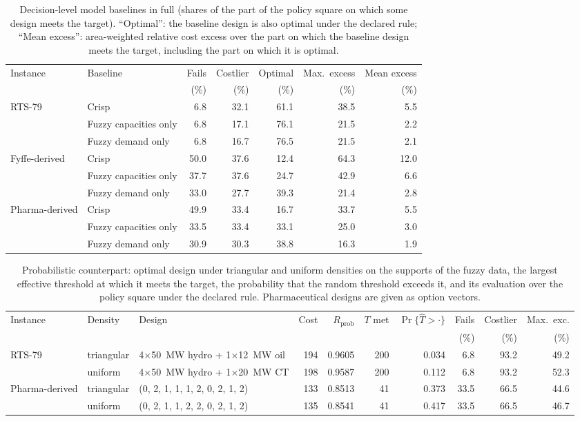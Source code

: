 \begin{table}[!htbp]
\centering
\caption{Decision-level model baselines in full (shares of the part of the policy square on which some design meets the target). ``Optimal'': the baseline design is also optimal under the declared rule; ``Mean excess'': area-weighted relative cost excess over the part on which the baseline design meets the target, including the part on which it is optimal.}
\label{tab:supp_baselines}
\footnotesize
\setlength{\tabcolsep}{4pt}
\begin{tabular}{llrrrrr}
\hline
Instance & Baseline & Fails & Costlier & Optimal & Max.\ excess & Mean excess\\
 & & (\%) & (\%) & (\%) & (\%) & (\%)\\
\hline
RTS-79 & Crisp & 6.8 & 32.1 & 61.1 & 38.5 & 5.5\\
 & Fuzzy capacities only & 6.8 & 17.1 & 76.1 & 21.5 & 2.2\\
 & Fuzzy demand only & 6.8 & 16.7 & 76.5 & 21.5 & 2.1\\
\hline
Fyffe-derived & Crisp & 50.0 & 37.6 & 12.4 & 64.3 & 12.0\\
 & Fuzzy capacities only & 37.7 & 37.6 & 24.7 & 42.9 & 6.6\\
 & Fuzzy demand only & 33.0 & 27.7 & 39.3 & 21.4 & 2.8\\
\hline
Pharma-derived & Crisp & 49.9 & 33.4 & 16.7 & 33.7 & 5.5\\
 & Fuzzy capacities only & 33.5 & 33.4 & 33.1 & 25.0 & 3.0\\
 & Fuzzy demand only & 30.9 & 30.3 & 38.8 & 16.3 & 1.9\\
\hline
\end{tabular}
\end{table}

\begin{table}[!htbp]
\centering
\caption{Probabilistic counterpart: optimal design under triangular and uniform densities on the supports of the fuzzy data, the largest effective threshold at which it meets the target, the probability that the random threshold exceeds it, and its evaluation over the policy square under the declared rule. Pharmaceutical designs are given as option vectors.}
\label{tab:supp_probabilistic}
\footnotesize
\setlength{\tabcolsep}{2.5pt}
\begin{tabular}{llp{3.3cm}rrrrrrr}
\hline
Instance & Density & Design & Cost & $R_{\mathrm{prob}}$ & $T$ met & $\Pr\{\hat{T}>\cdot\}$ & Fails & Costlier & Max.\ exc.\\
 & & & & & & & (\%) & (\%) & (\%)\\
\hline
RTS-79 & triangular & 4$\times$50~MW hydro + 1$\times$12~MW oil & 194 & 0.9605 & 200 & 0.034 & 6.8 & 93.2 & 49.2\\
 & uniform & 4$\times$50~MW hydro + 1$\times$20~MW CT & 198 & 0.9587 & 200 & 0.112 & 6.8 & 93.2 & 52.3\\
Pharma-derived & triangular & (0, 2, 1, 1, 1, 2, 0, 2, 1, 2) & 133 & 0.8513 & 41 & 0.373 & 33.5 & 66.5 & 44.6\\
 & uniform & (0, 2, 1, 1, 2, 2, 0, 2, 1, 2) & 135 & 0.8541 & 41 & 0.417 & 33.5 & 66.5 & 46.7\\
\hline
\end{tabular}
\end{table}
